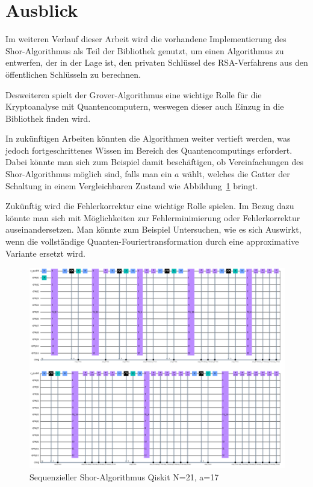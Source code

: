 \documentclass[lettersize,journal]{IEEEtran}
\begin{document}
\section{Ausblick}
Im weiteren Verlauf dieser Arbeit wird die vorhandene Implementierung des Shor-Algorithmus
als Teil der Bibliothek genutzt,
um einen Algorithmus zu entwerfen, der in der Lage ist,
den privaten Schlüssel des RSA-Verfahrens aus den öffentlichen Schlüsseln zu berechnen.

Desweiteren spielt der Grover-Algorithmus eine wichtige Rolle für die Kryptoanalyse mit Quantencomputern,
weswegen dieser auch Einzug in die Bibliothek finden wird.

In zukünftigen Arbeiten könnten die Algorithmen weiter vertieft werden,
was jedoch fortgeschrittenes Wissen im Bereich des Quantencomputings erfordert.
Dabei könnte man sich zum Beispiel damit beschäftigen,
ob Vereinfachungen des Shor-Algorithmus möglich sind, falls man ein \(a\) wählt,
welches die Gatter der Schaltung in einem Vergleichbaren Zustand wie Abbildung~\ref{fig:QiskitN1a17} bringt.

Zukünftig wird die Fehlerkorrektur eine wichtige Rolle spielen.
Im Bezug dazu könnte man sich mit Möglichkeiten zur Fehlerminimierung oder Fehlerkorrektur auseinandersetzen.
Man könnte zum Beispiel Untersuchen, wie es sich Auswirkt,
wenn die vollständige Quanten-Fouriertransformation durch eine approximative Variante ersetzt wird.

\begin{figure}[p]
\centering
\caption{Sequenzieller Shor-Algorithmus Qiskit N=21, a=17}
\label{fig:QiskitN1a17}
\includegraphics[height=\linewidth,angle=90]{qiskit_Shor_21_a17.PNG}
\end{figure}
\end{document}
